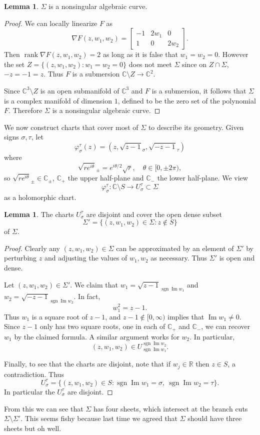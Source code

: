\documentclass[12pt]{report}
\newcommand{\RR}{\mathbb{R}}
\newcommand{\CC}{\mathbb{C}}
\DeclareMathOperator{\sgn}{sgn}
\DeclareMathOperator{\rank}{rank}
\renewcommand{\Im}{\operatorname{Im}}
\theoremstyle{definition}
\newtheorem{lemma}[theorem]{Lemma}
\begin{document}
\begin{lemma}
$\Sigma$ is a nonsingular algebraic curve.
\end{lemma}
\begin{proof}
We can locally linearize $F$ as
$$\nabla F(z, w_1, w_2) = \begin{bmatrix}-1 & 2w_1 & 0\\1 & 0 & 2w_2\end{bmatrix}.$$
Then $\rank \nabla F(z, w_1, w_2) = 2$ as long as it is false that $w_1 = w_2 = 0$.
However the set $Z = \{(z, w_1, w_2): w_1 = w_2 = 0\}$ does not meet $\Sigma$ since on $Z \cap \Sigma$, $-z = -1 = z$.
Thus $F$ is a submersion $\CC \setminus Z \to \CC^2$.

Since $\CC^3 \setminus Z$ is an open submanifold of $\CC^3$ and $F$ is a submersion, it follows that $\Sigma$ is a complex manifold of dimension $1$, defined to be the zero set of the polynomial $F$.
Therefore $\Sigma$ is a nonsingular algebraic curve.
\end{proof}
We now construct charts that cover most of $\Sigma$ to describe its geometry. Given signs $\sigma,\tau$, let
$$\varphi_\sigma^\tau(z) = (z, \sqrt{z-1}_\sigma, \sqrt{-z-1}_\tau)$$
where
$$\sqrt{re^{i\theta}}_\pm = e^{i\theta/2}\sqrt r,\quad\theta \in [0, \pm 2\pi),$$
so $\sqrt{re^{i\theta}}_\pm \in \CC_\pm$, $\CC_+$ the upper half-plane and $\CC_-$ the lower half-plane.
We view
$$\varphi_\sigma^\tau: \CC \setminus S \to U_\sigma^\tau \subset \Sigma$$
as a holomorphic chart.
\begin{lemma}
The charts $U_\sigma^\tau$ are disjoint and cover the open dense subset
$$\Sigma' = \{(z, w_1, w_2) \in \Sigma: z \notin S\}$$
of $\Sigma$.
\end{lemma}
\begin{proof}
Clearly any $(z, w_1, w_2) \in \Sigma$ can be approximated by an element of $\Sigma'$ by perturbing $z$ and adjusting the values of $w_1,w_2$ as necessary. Thus $\Sigma'$ is open and dense.

Let $(z, w_1, w_2) \in \Sigma'$. We claim that $w_1 = \sqrt{z-1}_{\sgn \Im w_1}$ and $w_2 = \sqrt{-z-1}_{\sgn \Im w_2}$.
In fact,
$$w_1^2 = z - 1.$$
Thus $w_1$ is a square root of $z - 1$, and $z - 1 \notin [0, \infty)$ implies that $\Im w_1 \neq 0$.
Since $z - 1$ only has two square roots, one in each of $\CC_+$ and $\CC_-$, we can recover $w_1$ by the claimed formula.
A similar argument works for $w_2$.
In particular,
$$(z, w_1, w_2) \in U_{\sgn \Im w_1}^{\sgn \Im w_2}.$$

Finally, to see that the charts are disjoint, note that if $w_j \in \RR$ then $z \in S$, a contradiction. Thus
$$U_\sigma^\tau = \{(z, w_1, w_2) \in S: \sgn \Im w_1 = \sigma,~\sgn \Im w_2 = \tau\}.$$
In particular the $U_\sigma^\tau$ are disjoint.
\end{proof}
From this we can see that $\Sigma$ has four sheets, which intersect at the branch cuts $\Sigma \setminus \Sigma'$.
This seems fishy because last time we agreed that $\Sigma$ should have three sheets but oh well.
\end{document}
